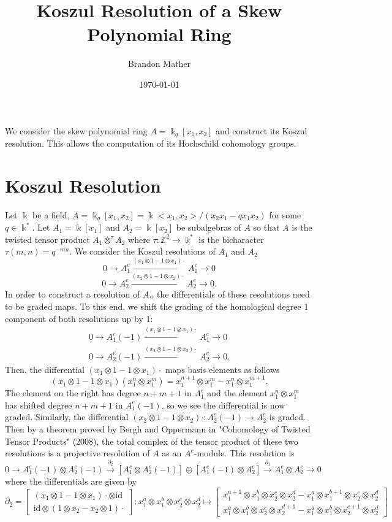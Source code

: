 \documentclass[12pt,a4paper]{article}
\title{Koszul Resolution of a Skew Polynomial Ring}
\author{Brandon Mather}
\date{\today}
\affil{Departments of Mathematics, University of North Texas}
\newcommand\ZZ{\mathbb{Z}}
\newcommand{\kk}{\Bbbk}
\newcommand\1{_{(1)}}
\newcommand\2{_{(2)}}
\begin{document}
\maketitle

We consider the skew polynomial ring $A=\kk_q[x_1,x_2]$ and construct its Koszul resolution. 
This allows the computation of its Hochschild cohomology groups.

\section{Koszul Resolution}

Let $\kk$ be a field, $A=\kk_q[x_1,x_2]=\kk<x_1,x_2>/(x_2x_1-qx_1x_2)$ for some $q\in\kk^*$.
Let $A_1=\kk[x_1]$ and $A_2=\kk[x_2]$ be subalgebras of $A$ so that $A$ is the twisted tensor product $A_1\otimes^\tau A_2$ where $\tau:\ZZ^2\to\kk^*$ is the bicharacter $\tau(m,n)= q^{-mn}$.
We consider the Koszul resolutions of $A_1$ and $A_2$
\[
  0\to A_1^e\xrightarrow{(x_1\otimes 1-1\otimes x_1)\cdot}A_1^e\to 0
\]
\[
0\to A_2^e\xrightarrow{(x_2\otimes 1-1\otimes x_2)\cdot}A_2^e\to 0.  
\]
In order to construct a resolution of $A$,, the differentials of these resolutions need to be graded maps.
To this end, we shift the grading of the homological degree 1 component of both resolutions up by 1:
\begin{align*}
0\to A_1^e(-1)\xrightarrow{(x_1\otimes 1-1\otimes x_1)\cdot}A_1^e\to 0\\
0\to A_2^e(-1)\xrightarrow{(x_2\otimes 1-1\otimes x_2)\cdot}A_2^e\to 0.  
\end{align*}
Then, the differential $(x_1\otimes 1-1\otimes x_1)\cdot$ maps basis elements as follows
\[
(x_1\otimes 1-1\otimes x_1)(x_1^n\otimes x_1^m)=x_1^{n+1}\otimes x_1^m-x_1^n\otimes x_1^{m+1}.
\]
The element on the right has degree $n+m+1$ in $A_1^e$ and the element $x_1^n\otimes x_1^m$ has shifted degree $n+m+1$ in $A_1^e(-1)$, so we see the differential is now graded.
Similarly, the differential $(x_2\otimes 1-1\otimes x_2)\cdot:A_2^e(-1)\to A_2^e$ is graded.
\\

Then by a theorem proved by Bergh and Oppermann in "Cohomology of Twisted Tensor Products" (2008), the total complex of the tensor product of these two resolutions is a projective resolution of $A$ as an $A^e$-module.
This resolution is 
\[
0\to A_1^e(-1)\otimes A_2^e(-1)\xrightarrow{\partial_2}\left[A_1^e\otimes A_2^e(-1)\right]\oplus \left[A_1^e(-1)\otimes A_2^e\right]\xrightarrow{\partial_1}A_1^e\otimes A_2^e\to 0
\]
where the differentials are given by
\[
\partial_2=\begin{bmatrix}(x_1\otimes 1-1\otimes x_1)\cdot\otimes \text{id}\\\text{id}\otimes(1\otimes x_2-x_2\otimes 1)\cdot\end{bmatrix}:x_1^a\otimes x_1^b\otimes x_2^c\otimes x_2^d\mapsto\begin{bmatrix}x_1^{a+1}\otimes x_1^b\otimes x_2^c\otimes x_2^d-x_1^a\otimes x_1^{b+1}\otimes x_2^c\otimes x_2^d\\ x_1^a\otimes x_1^b\otimes x_2^c\otimes x_2^{d+1}-x_1^a\otimes x_1^b\otimes x_2^{c+1}\otimes x_2^d\end{bmatrix}
\]
\end{document}
